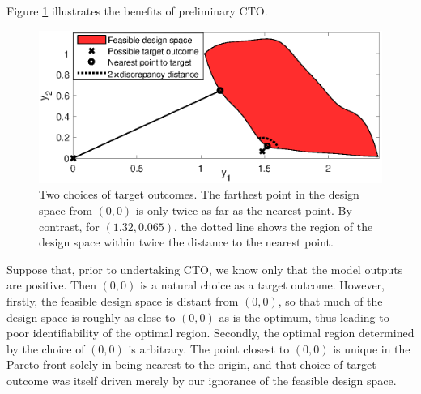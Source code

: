 \documentclass[12pt]{article}
\begin{document}
Figure \ref{fig:do_selection_example} illustrates the benefits of preliminary CTO.
%
\begin{figure}
\centering
\includegraphics[scale=.8]{FIG_des_obs_selection_example.eps}
\caption{Two choices of target outcomes. 
%
The farthest point in the design space from $(0,0)$ is only twice as far as  the nearest point.
%
By contrast, for $(1.32,0.065)$, the dotted line shows the region of the design space within twice the distance to the nearest point.}
\label{fig:do_selection_example}
\end{figure}
%
Suppose that, prior to undertaking CTO, we know only that the model outputs are positive.
%
Then $(0,0)$ is a natural choice as a target outcome.
%
%
However, firstly, the feasible design space is distant from $(0,0)$, so that much of the design space is roughly as close to $(0,0)$ as is the optimum, thus leading to poor identifiability of the optimal region.
%
%
%
%
Secondly, the optimal region determined by the choice of $(0,0)$ is arbitrary.
%
%
The point closest to $(0,0)$ is 
%
unique in the Pareto front solely in being nearest to the origin, and that choice of target outcome was itself driven merely by our ignorance of the feasible design space.
\end{document}
